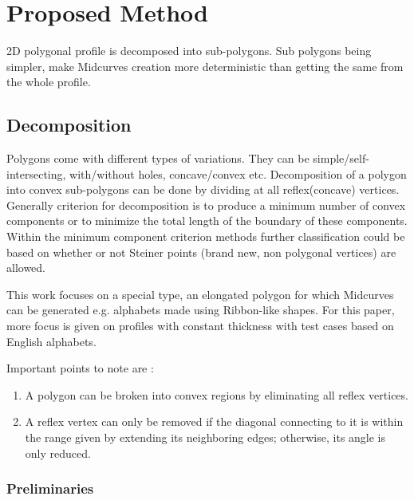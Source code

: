 \section{Proposed Method}	


2D polygonal profile is decomposed  into sub-polygons. Sub polygons being simpler, make Midcurves creation more deterministic than getting the same from the whole profile.

\subsection{Decomposition}
Polygons come with different types of variations. They can be simple/self-intersecting, with/without holes, concave/convex etc. Decomposition of a polygon into convex sub-polygons can be done by dividing at all reflex(concave) vertices. Generally criterion for decomposition is to produce a minimum number of convex components or to minimize the total length of the boundary of these components. Within the minimum component criterion methods further classification could be based on whether or not Steiner points (brand new, non polygonal vertices) are allowed. 

This work focuses on a special type, an elongated polygon for which Midcurves can be generated e.g. alphabets made using Ribbon-like shapes. For this paper, more focus is given on profiles with constant thickness with test cases based on English alphabets. 

Important points to note are \cite{Bayazit}:
\begin{enumerate}
\item A polygon can be broken into convex regions by eliminating all reflex vertices.
\item A reflex vertex can only be removed if the diagonal connecting to it is within the range given by extending its neighboring edges; otherwise, its angle is only reduced.
\end{enumerate}

\subsubsection{Preliminaries}

